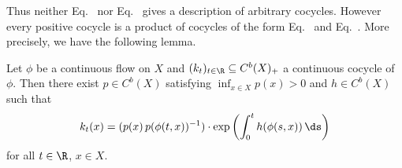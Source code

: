 Thus neither Eq.~ nor Eq.~ gives a description of arbitrary cocycles.
However every positive cocycle is a product of cocycles of the form Eq.~ and Eq.~.
More precisely, we have the following lemma.
\begin{lemma}\label{lem:b2-3.12}
Let $\phi$ be a continuous flow on $X$ and $(k_{t})_{t \in \R} \subseteq C^{b}(X)_{+}$ a continuous cocycle of\/ $\phi$.
Then there exist $p \in C^{b}(X)$ satisfying $\inf_{x \in X} p(x) > 0$ and $h \in C^{b}(X)$ such that
\begin{equation}\label{eq:b2-3.15}
k_{t}(x) = ( p(x) \, p(\phi(t,x))^{-1} ) \cdot \exp\left(\int_{0}^{t} h(\phi(s,x))\, \ds\right)
\end{equation}
for all $t \in \R$, $x \in X$.
\end{lemma}

